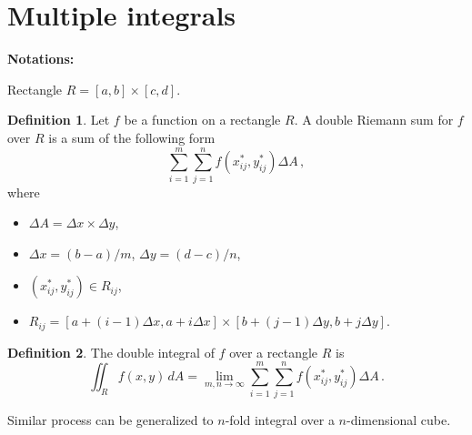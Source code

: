\documentclass[
]{article}
\theoremstyle{definition}
\newtheorem{definition}{Definition}[section]
\theoremstyle{definition}
\theoremstyle{definition}
\theoremstyle{definition}
\theoremstyle{remark}
\begin{document}
\newpage

\hypertarget{multiple-integrals}{%
\section{Multiple integrals}\label{multiple-integrals}}

\textbf{Notations:}

Rectangle \(R= [a,b]\times [c,d]\).

\begin{definition}

Let \(f\) be a function on a rectangle \(R\).
A double Riemann sum for \(f\) over \(R\) is a sum of the following form
\begin{equation*}
 \sum_{i=1}^m \sum_{j=1}^n f(x_{ij}^*, y_{ij}^*) \Delta A \,,
\end{equation*}
where

\begin{itemize}
\item
  \(\Delta A = \Delta x\times \Delta y\),
\item
  \(\Delta x = (b-a)/m\), \(\Delta y = (d-c)/n\),
\item
  \((x_{ij}^*,y_{ij}^*) \in R_{ij}\),
\item
  \(R_{ij} = [a + (i-1)\Delta x, a+ i\Delta x]\times [b + (j-1)\Delta y, b+ j\Delta y]\).
\end{itemize}

\end{definition}

\begin{definition}
The double integral of \(f\) over a rectangle \(R\) is
\begin{equation*}
    \iint_{R} f(x,y) \, dA = \lim_{m,n\to \infty} \sum_{i=1}^m \sum_{j=1}^n f(x_{ij}^*, y_{ij}^*) \Delta A \,.
\end{equation*}
\end{definition}

Similar process can be generalized to \(n\)-fold integral over a \(n\)-dimensional cube.
\end{document}
